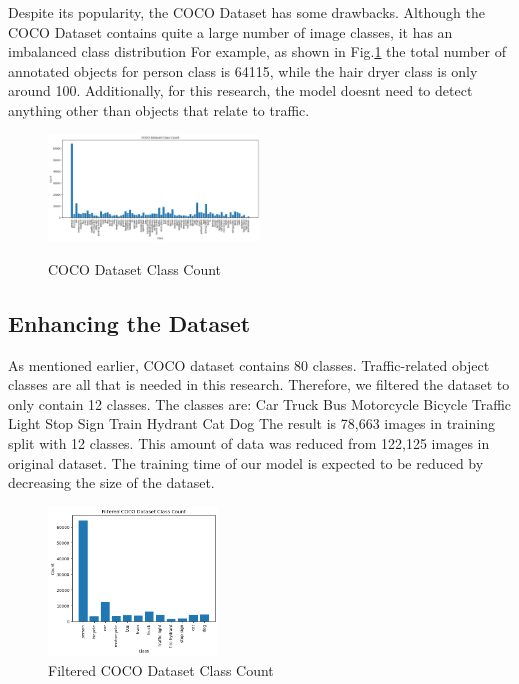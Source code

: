 \documentclass[conference]{IEEEtran}
\begin{document}
Despite its popularity, the COCO Dataset has some drawbacks. 
Although the COCO Dataset contains quite a large number of image classes, it has an imbalanced class distribution 
For example, as shown in Fig.\ref{fig:original_coco_classes_count} the total number of annotated objects for person class is 64115, while the hair dryer class is only around 100. Additionally, for this research, the model doesnt need to detect anything other than objects that relate to traffic.
\begin{figure}[!h]
\centering
\includegraphics[width=0.5\textwidth,keepaspectratio]{coco_class_count.png}\label{fig:original_coco_classes_count}
\caption{COCO Dataset Class Count}
\end{figure}


\subsection{Enhancing the Dataset}\label{Filtering}
As mentioned earlier, COCO dataset contains 80 classes. Traffic-related object classes are all that is needed in this research.
Therefore, we filtered the dataset to only contain 12 classes. The classes are:
Car Truck Bus Motorcycle Bicycle Traffic Light Stop Sign Train Hydrant Cat Dog
The result is 78,663 images in training split with 12 classes. This amount of data was reduced from 122,125 images in original dataset. The training time of our model is expected to be reduced by decreasing the size of the dataset.
\begin{figure}[h!]
\centering
\includegraphics[width=0.4\textwidth]{filtered_coco_class_count.png}
\caption{Filtered COCO Dataset Class Count}
\label{fig:COCOFiltered}
\end{figure}
\end{document}
